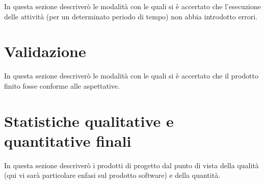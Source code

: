 In questa sezione descriverò le modalità con le quali si è accertato che l’esecuzione delle attività (per un determinato periodo di tempo) non abbia introdotto errori.

\section{Validazione}

In questa sezione descriverò le modalità con le quali si è accertato che il prodotto finito fosse conforme alle aspettative.

\section{Statistiche qualitative e quantitative finali}

In questa sezione descriverò i prodotti di progetto dal punto di vista della qualità (qui vi sarà particolare enfasi sul prodotto software) e della quantità.
